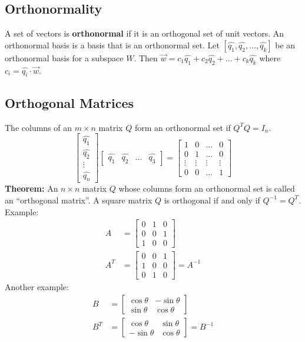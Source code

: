 \documentclass{math}
\begin{document}
\subsection*{Orthonormality}
A set of vectors is \textbf{orthonormal} if it is an orthogonal set of unit
vectors. An orthonormal basis is a basis that is an orthonormal set. Let
\( [\hat{q_1},\hat{q_2},\dots,\hat{q_k}] \) be an orthonormal basis for a
subspace \( W \). Then \( \vec{w} = c_1\hat{q_1}+c_2\hat{q_2}+\dots+
c_k\hat{q_k} \) where \( c_i = \hat{q_i}\cdot\vec{w} \).

\subsection*{Orthogonal Matrices}
The columns of an \( m\times n \) matrix \( Q \) form an orthonormal set if
\( Q^TQ = I_n \).
\[ \begin{bmatrix}\hat{q_1} \\ \hat{q_2} \\ \vdots \\ \hat{q_n}\end{bmatrix}
  \begin{bmatrix}\hat{q_1} & \hat{q_2} & \dots & \hat{q_3}\end{bmatrix} =
  \begin{bmatrix}
    1 & 0 & \dots & 0 \\
    0 & 1 & \dots & 0 \\
    \vdots & \vdots & \vdots & \vdots \\
    0 & 0 & \dots & 1
  \end{bmatrix} \]
\textbf{Theorem:} An \( n\times n \) matrix \( Q \) whose columns form an
orthonormal set is called an ``orthogonal matrix''. A square matrix \( Q \) is
orthogonal if and only if \( Q^{-1} = Q^T \). Example:
\begin{align*}
  A &= \begin{bmatrix}
    0 & 1 & 0 \\
    0 & 0 & 1 \\
    1 & 0 & 0
  \end{bmatrix} \\
  A^T &= \begin{bmatrix}
    0 & 0 & 1 \\
    1 & 0 & 0 \\
    0 & 1 & 0
  \end{bmatrix} = A^{-1}
\end{align*}
Another example:
\begin{align*}
  B &= \begin{bmatrix}
    \cos\theta & -\sin\theta \\
    \sin\theta & \cos\theta
  \end{bmatrix} \\
  B^T &= \begin{bmatrix}
    \cos\theta & \sin\theta \\
    -\sin\theta & \cos\theta
  \end{bmatrix} = B^{-1}
\end{align*}
\end{document}
